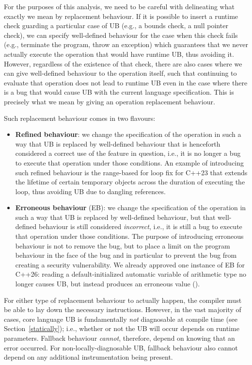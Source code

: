 For the purposes of this analysis, we need to be careful with delineating what exactly we mean by replacement behaviour. If it is possible to insert a runtime check guarding a particular case of UB (e.g., a bounds check, a null pointer check), we can specify well-defined behaviour for the case when this check fails (e.g., terminate the program, throw an exception) which guarantees that we never actually execute the operation that would have runtime UB, thus avoiding it. However, regardless of the existence of that check, there are also cases where we can give well-defined behaviour to the operation itself, such that continuing to evaluate that operation does not lead to runtime UB even in the case where there is a bug that would cause UB with the current language specification. This is precisely what we mean by giving an operation replacement behaviour.

Such replacement behaviour comes in two flavours:

\begin{itemize}
\item \textbf{Refined behaviour}: we change the specification of the operation in such a way that UB is replaced by well-defined behaviour that is henceforth considered a correct use of the feature in question, i.e., it is no longer a bug to execute that operation under those conditions. An example of introducing such refined behaviour is the range-based for loop fix \cite{P2644R1} for C++23 that extends the lifetime of certain temporary objects across the duration of executing the loop, thus avoiding UB due to dangling references.
\item \textbf{Erroneous behaviour} (EB): we change the specification of the operation in such a way that UB is replaced by well-defined behaviour, but that well-defined behaviour is still considered \emph{incorrect}, i.e., it is still a bug to execute that operation under those conditions. The purpose of introducing erroneous behaviour is not to remove the bug, but to place a limit on the program behaviour in the face of the bug and in particular to prevent the bug from creating a security vulnerability. We already approved one instance of EB for C++26:  reading a default-initialized automatic variable of arithmetic type no longer causes UB, but instead produces an erroneous value (\cite{P2795R5}).
\end{itemize}

For either type of replacement behaviour to actually happen, the compiler must be able to lay down the necessary instructions. However, in the vast majority of cases, core language UB is fundamentally \emph{not} diagnosable at compile time (see Section~\ref{statically}); i.e., whether or not the UB will occur depends on runtime parameters. Fallback behaviour \emph{cannot}, therefore, depend on knowing that an error occurred. For non-locally-diagnosable UB, fallback behaviour also cannot depend on any additional instrumentation being present.

